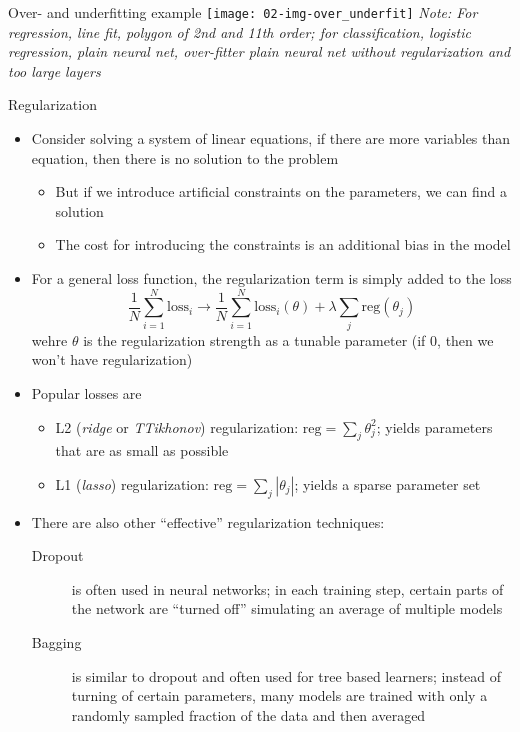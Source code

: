     \begin{frame}{Over- and underfitting example}
      \texttt{[image: 02-img-over\_underfit]}
      \enlargethispage{3em}
      \emph{\footnotesize Note: For regression, line fit, polygon of 2nd and 11th order; for classification, logistic regression, plain neural net, over-fitter plain neural net without regularization and too large layers}
    \end{frame}

    \begin{frame}{Regularization}
      \begin{itemize}
        \item Consider solving a system of linear equations, if there are more variables than equation, then there is no solution to the problem
        \begin{itemize}
          \item But if we introduce artificial constraints on the parameters, we can find a solution
          \item The cost for introducing the constraints is an additional bias in the model
        \end{itemize}
        \item For a general loss function, the regularization term is simply added to the loss
          \begin{equation*}
            \frac{1}{N}\sum_{i=1}^N \mathrm{loss}_i \rightarrow
            \frac{1}{N}\sum_{i=1}^N \mathrm{loss}_i(\theta)
              + \lambda \sum_j\mathrm{reg}(\theta_j)
          \end{equation*}
          wehre $\theta$ is the regularization strength as a tunable parameter (if $0$, then we won't have regularization)
        \item Popular losses are
        \begin{itemize}
          \item L2 (\emph{ridge} or \emph{TTikhonov}) regularization: $\mathrm{reg} = \sum_j \theta_j^2$; yields parameters that are as small as possible
          \item L1 (\emph{lasso}) regularization: $\mathrm{reg} = \sum_j\left|\theta_j\right|$; yields a sparse parameter set
        \end{itemize}
        \item There are also other \enquote{effective} regularization techniques:  %
        \begin{description}
          \item[Dropout] is often used in neural networks; in each training step, certain parts of the network are \enquote{turned off} simulating an average of multiple models
          \item[Bagging] is similar to dropout and often used for tree based learners; instead of turning of certain parameters, many models are trained with only a randomly sampled fraction of the data and then averaged
        \end{description}
      \end{itemize}
    \end{frame}

